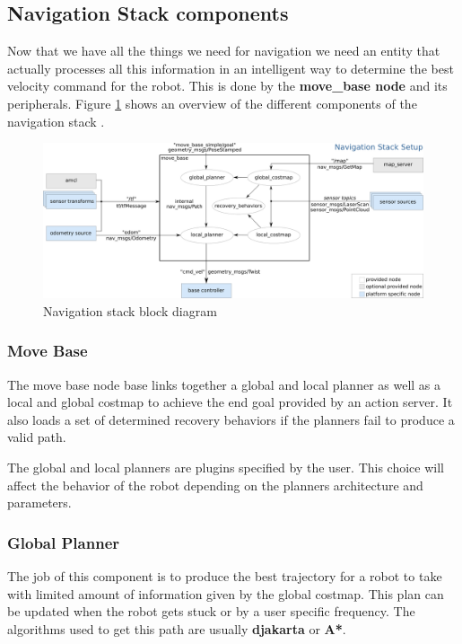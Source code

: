 \documentclass[12pt]{article}
\begin{document}
\subsection{Navigation Stack components}
Now that we have all the things we need for navigation we need an entity that actually processes all this information in an intelligent way to determine the best velocity command for the robot. This is done by the \textbf{move\_base node} and its peripherals.
Figure \ref{fig:nav_stack} shows an overview of the different components of the navigation stack \cite{movebase}.
\begin{figure}[!htb]
    \centering
    \includegraphics[width=\linewidth]{overview_tf.png}
    \caption{Navigation stack block diagram}
    \label{fig:nav_stack}
\end{figure}

\subsubsection{Move Base}

The move base node base links together a global and local planner as well as a local and global costmap to achieve the end goal provided by an action server. It also loads a set of determined recovery behaviors if the planners fail to produce a valid path. 

The global and local planners are plugins specified by the user. This choice will affect the behavior of the robot depending on the planners architecture and parameters. 

\subsubsection{Global Planner}
 
The job of this component is to produce the best trajectory for a robot to take with limited amount of information given by the global costmap.
This plan can be updated when the robot gets stuck or by a user specific frequency. The algorithms used to get this path are usually \textbf{djakarta} or \textbf{A*}.
\end{document}
